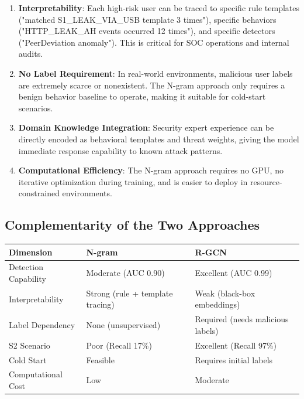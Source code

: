 \documentclass[
  a4paper,
  11pt]{article}
\newcounter{none} %
\begin{document}
\begin{enumerate}
\def\labelenumi{\arabic{enumi}.}
\item
  \textbf{Interpretability}: Each high-risk user can be traced to
  specific rule templates ("matched S1\_LEAK\_VIA\_USB template 3
  times"), specific behaviors ("HTTP\_LEAK\_AH events occurred 12
  times"), and specific detectors ("PeerDeviation anomaly"). This is
  critical for SOC operations and internal audits.
\item
  \textbf{No Label Requirement}: In real-world environments, malicious
  user labels are extremely scarce or nonexistent. The N-gram approach
  only requires a benign behavior baseline to operate, making it
  suitable for cold-start scenarios.
\item
  \textbf{Domain Knowledge Integration}: Security expert experience can
  be directly encoded as behavioral templates and threat weights, giving
  the model immediate response capability to known attack patterns.
\item
  \textbf{Computational Efficiency}: The N-gram approach requires no
  GPU, no iterative optimization during training, and is easier to
  deploy in resource-constrained environments.
\end{enumerate}

\subsection{Complementarity of the Two
Approaches}\label{complementarity-of-the-two-approaches}

{\def\LTcaptype{none} %
\begin{longtable}[]{@{}L{0.24}L{0.26}L{0.42}@{}}
\toprule\noalign{}
Dimension & N-gram & R-GCN \\
\midrule\noalign{}
\endhead
\bottomrule\noalign{}
\endlastfoot
Detection Capability & Moderate (AUC 0.90) & Excellent (AUC 0.99) \\
Interpretability & Strong (rule + template tracing) & Weak (black-box
embeddings) \\
Label Dependency & None (unsupervised) & Required (needs malicious
labels) \\
S2 Scenario & Poor (Recall 17\%) & Excellent (Recall 97\%) \\
Cold Start & Feasible & Requires initial labels \\
Computational Cost & Low & Moderate \\
\end{longtable}
}
\end{document}
